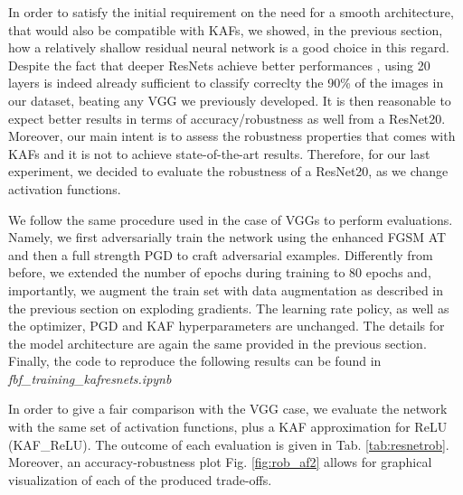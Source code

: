 \documentclass[LaM,binding=0.6cm]{./packages/sapthesis/sapthesis}
\begin{document}
        In order to satisfy the initial requirement on the need for a smooth architecture, that would also be compatible with KAFs, we showed, in the previous section, how a relatively shallow residual neural network is 
        a good choice in this regard. Despite the fact that deeper ResNets achieve better performances \cite{resnet}, using 20 layers is indeed already sufficient to classify correclty the 90\% of the images in our dataset, beating 
        any VGG we previously developed. It is then reasonable to expect better results in terms of accuracy/robustness as well from a ResNet20. Moreover, our main intent is to assess the robustness properties that comes with 
        KAFs and it is not to achieve state-of-the-art results. Therefore, for our last experiment, we decided to evaluate the robustness of a ResNet20, as we change activation functions.

        We follow the same procedure used in the case of VGGs to perform evaluations. Namely, we first adversarially train the network using the enhanced FGSM AT and then a full strength PGD to craft adversarial examples.
        Differently from before, we extended the number of epochs during training to 80 epochs and, importantly, we augment the train set with data augmentation as described in the previous section on exploding gradients.
        The learning rate policy, as well as the optimizer, PGD and KAF hyperparameters are unchanged. The details for the model architecture 
        are again the same provided in the previous section. Finally, the code to reproduce the following results can be found in \textit{fbf\_training\_kafresnets.ipynb}

        In order to give a fair comparison with the VGG case, we evaluate the network with the same set of activation functions, plus 
        a KAF approximation for ReLU (KAF\_ReLU). The outcome of each evaluation is given in Tab. \ref{tab:resnetrob}. Moreover, an accuracy-robustness
        plot Fig. \ref{fig:rob_af2} allows for graphical visualization of each of the produced trade-offs.
\end{document}
